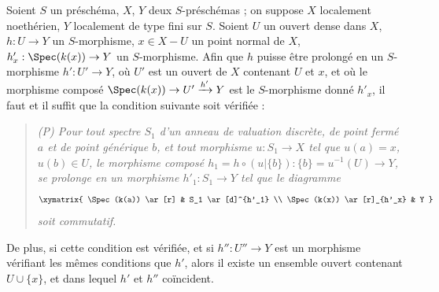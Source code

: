 \begin{proposition}[20.4.6]
\label{IV.20.4.6}
Soient $S$ un préschéma, $X$, $Y$ deux $S$-préschémas ; on suppose $X$ localement noethérien, $Y$ localement de type fini sur $S$.
Soient $U$ un ouvert dense dans $X$, $h:U\to Y$ un $S$-morphisme, $x\in X-U$ un point normal de $X$, $h'_x:\Spec(k(x))\to Y$ un $S$-morphisme.
Afin que $h$ puisse être prolongé en un $S$-morphisme $h':U'\to Y$, où $U'$ est un ouvert de $X$ contenant $U$ et $x$, et où le morphisme composé $\Spec(k(x))\to U'\xrightarrow{h'}Y$ est le $S$-morphisme donné $h'_x$, il faut et il suffit que la condition suivante soit vérifiée :
\begin{quote}
\emph{(P) Pour tout spectre $S_1$ d'un anneau de valuation discrète, de point fermé $a$ et de point générique $b$, et tout morphisme $u:S_1\to X$ tel que $u(a)=x$, $u(b)\in U$, le morphisme composé $h_1=h\circ(u|\{b\}):\{b\}=u^{-1}(U)\to Y$, se prolonge en un morphisme $h'_1:S_1\to Y$ tel que le diagramme}
\[
  \xymatrix{
  \Spec(k(a)) \ar[r] & S_1 \ar[d]^{h'_1} \\
  \Spec(k(x)) \ar[r]_{h'_x} & Y
  }
\]
\emph{soit commutatif.}
\end{quote}
De plus, si cette condition est vérifiée, et si $h'':U''\to Y$ est un morphisme vérifiant les mêmes conditions que $h'$, alors il existe un ensemble ouvert contenant $U\cup\{x\}$, et dans lequel $h'$ et $h''$ coïncident.
\end{proposition}

